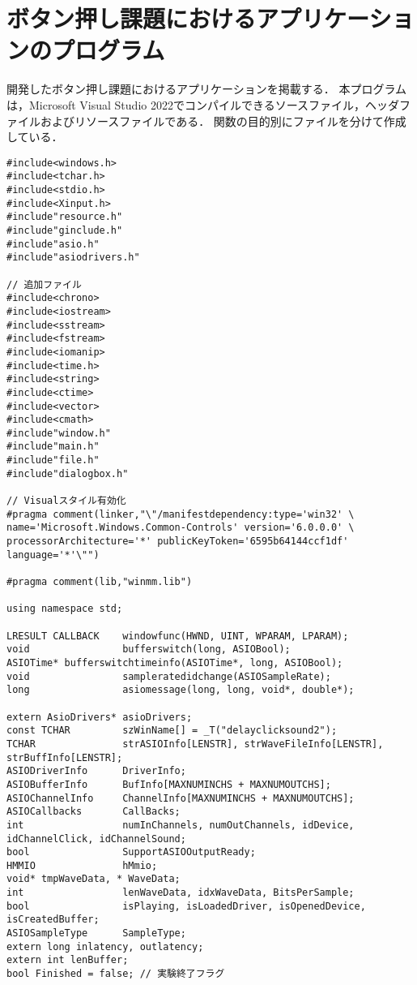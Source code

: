 \chapter{ボタン押し課題におけるアプリケーションのプログラム}
開発したボタン押し課題におけるアプリケーションを掲載する．
本プログラムは，Microsoft Visual Studio 2022でコンパイルできるソースファイル，ヘッダファイルおよびリソースファイルである．
関数の目的別にファイルを分けて作成している．

\begin{lstlisting}[caption=main.cpp]
	#include<windows.h>
#include<tchar.h>
#include<stdio.h>
#include<Xinput.h>
#include"resource.h"
#include"ginclude.h"
#include"asio.h"
#include"asiodrivers.h"

// 追加ファイル
#include<chrono>
#include<iostream>
#include<sstream>
#include<fstream>
#include<iomanip>
#include<time.h>
#include<string>
#include<ctime>
#include<vector>
#include<cmath>
#include"window.h"
#include"main.h"
#include"file.h"
#include"dialogbox.h"

// Visualスタイル有効化
#pragma comment(linker,"\"/manifestdependency:type='win32' \
name='Microsoft.Windows.Common-Controls' version='6.0.0.0' \
processorArchitecture='*' publicKeyToken='6595b64144ccf1df' language='*'\"")

#pragma comment(lib,"winmm.lib")

using namespace std;

LRESULT CALLBACK	windowfunc(HWND, UINT, WPARAM, LPARAM);
void				bufferswitch(long, ASIOBool);
ASIOTime* bufferswitchtimeinfo(ASIOTime*, long, ASIOBool);
void				sampleratedidchange(ASIOSampleRate);
long				asiomessage(long, long, void*, double*);

extern AsioDrivers* asioDrivers;
const TCHAR			szWinName[] = _T("delayclicksound2");
TCHAR				strASIOInfo[LENSTR], strWaveFileInfo[LENSTR], strBuffInfo[LENSTR];
ASIODriverInfo		DriverInfo;
ASIOBufferInfo		BufInfo[MAXNUMINCHS + MAXNUMOUTCHS];
ASIOChannelInfo		ChannelInfo[MAXNUMINCHS + MAXNUMOUTCHS];
ASIOCallbacks		CallBacks;
int					numInChannels, numOutChannels, idDevice, idChannelClick, idChannelSound;
bool				SupportASIOOutputReady;
HMMIO				hMmio;
void* tmpWaveData, * WaveData;
int					lenWaveData, idxWaveData, BitsPerSample;
bool				isPlaying, isLoadedDriver, isOpenedDevice, isCreatedBuffer;
ASIOSampleType		SampleType;
extern long inlatency, outlatency;
extern int lenBuffer;
bool Finished = false; // 実験終了フラグ


\end{lstlisting}
